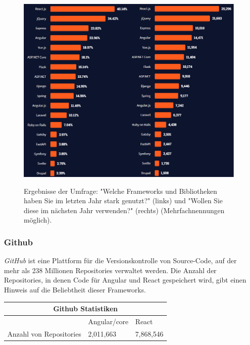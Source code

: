   \begin{figure}[h!]
    \centering
    \includegraphics[scale=0.5]{sources/Most_popular_Web_Frameworks_2021}
    \caption[Most popular Web Frameworks 2021]{}
    \label{fig:Most_popular_Web_Frameworks_2021} 
    Ergebnisse der Umfrage: "Welche Frameworks und Bibliotheken haben Sie im letzten Jahr stark genutzt?" (links) und "Wollen Sie diese im nächsten Jahr verwenden?" (rechts) (Mehrfachnennungen möglich)\cite{SO01}.
  \end{figure}

\subsubsection*{Github}
\textit{GitHub} ist eine Plattform für die Versionskontrolle von Source-Code, auf der mehr als 238 Millionen Repositories verwaltet werden{\cite{GH07}}.
Die Anzahl der Repositories, in denen Code für Angular und React gespeichert wird, gibt einen Hinweis auf die Beliebtheit dieser Frameworks.
\\
\begin{table}[h!]
  \centering
  \begin{tabular}{ |p{5cm}||p{3.6cm}|p{3.6cm}|  }
    \hline
    \multicolumn{3}{|c|}{Github Statistiken}\\
    \hline
    & Angular/core  {\cite{GH04}}& React {\cite{GH06}}\\
    \hline
    Anzahl von Repositories & 2,011,663& 7,868,546
    \\
    \hline
  \end{tabular}
\end{table}

